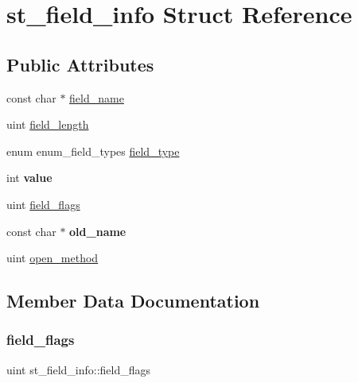 \hypertarget{structst__field__info}{}\section{st\+\_\+field\+\_\+info Struct Reference}
\label{structst__field__info}
\subsection*{Public Attributes}
\begin{DoxyCompactItemize}
\item 
const char $\ast$ \mbox{\hyperlink{structst__field__info_aad2046c4548bf5eafe4bdbeeb7298232}{field\+\_\+name}}
\item 
uint \mbox{\hyperlink{structst__field__info_a82de297dd0e4835ada40570f1a0822f9}{field\+\_\+length}}
\item 
enum enum\+\_\+field\+\_\+types \mbox{\hyperlink{structst__field__info_a70226cb26db7fb2d7bbde155db4c6829}{field\+\_\+type}}
\item 
\mbox{\label{structst__field__info_a8fe117a94b789a4e3fdef4c94d2031e4}} 
int {\bfseries value}
\item 
uint \mbox{\hyperlink{structst__field__info_a5cc25359e4b59962ae5b2fb6ea387fed}{field\+\_\+flags}}
\item 
\mbox{\label{structst__field__info_ab9436c9efd5fd0ac0bc0198c33c7998f}} 
const char $\ast$ {\bfseries old\+\_\+name}
\item 
uint \mbox{\hyperlink{structst__field__info_a7e8e6e6d5634ec75f81a0540dc3ed7dd}{open\+\_\+method}}
\end{DoxyCompactItemize}


\subsection{Member Data Documentation}
\mbox{\label{structst__field__info_a5cc25359e4b59962ae5b2fb6ea387fed}} 
\subsubsection{\texorpdfstring{field\+\_\+flags}{field\_flags}}
{\footnotesize\ttfamily uint st\+\_\+field\+\_\+info\+::field\+\_\+flags}

